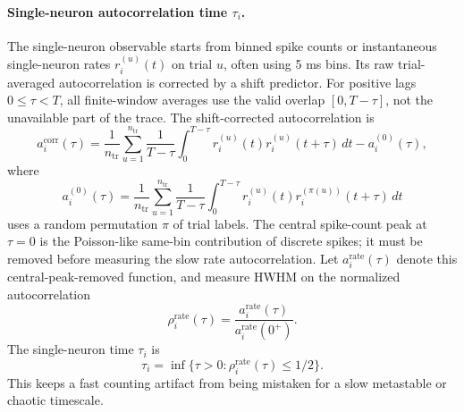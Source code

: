 \paragraph{Single-neuron autocorrelation time \(\tau_i\).}
The single-neuron observable starts from binned spike counts or instantaneous
single-neuron rates \(r_i^{(u)}(t)\) on trial \(u\), often using 5 ms bins. Its
raw trial-averaged autocorrelation is corrected by a shift predictor. For
positive lags \(0\le \tau<T\), all finite-window averages use the valid overlap
\([0,T-\tau]\), not the unavailable part of the trace. The shift-corrected
autocorrelation is
\begin{equation}
    a_i^{\mathrm{corr}}(\tau)
    =
    \frac{1}{n_{\mathrm{tr}}}
    \sum_{u=1}^{n_{\mathrm{tr}}}
    \frac{1}{T-\tau}
    \int_0^{T-\tau}
    r_i^{(u)}(t)r_i^{(u)}(t+\tau)\,dt
    -
    a_i^{(0)}(\tau),
    \label{eq:ch10-single-neuron-autocorrelation}
\end{equation}
where
\begin{equation}
    a_i^{(0)}(\tau)
    =
    \frac{1}{n_{\mathrm{tr}}}
    \sum_{u=1}^{n_{\mathrm{tr}}}
    \frac{1}{T-\tau}
    \int_0^{T-\tau}
    r_i^{(u)}(t)r_i^{(\pi(u))}(t+\tau)\,dt
    \label{eq:ch10-shift-predictor}
\end{equation}
uses a random permutation \(\pi\) of trial labels. The central spike-count peak
at \(\tau=0\) is the Poisson-like same-bin contribution of discrete spikes; it
must be removed before measuring the slow rate autocorrelation. Let
\(a_i^{\mathrm{rate}}(\tau)\) denote this central-peak-removed function, and
measure HWHM on the normalized autocorrelation
\[
    \rho_i^{\mathrm{rate}}(\tau)
    =
    \frac{a_i^{\mathrm{rate}}(\tau)}
    {a_i^{\mathrm{rate}}(0^+)}.
\]
The single-neuron time \(\tau_i\) is
\begin{equation}
    \tau_i
    =
    \inf\{\tau>0:\rho_i^{\mathrm{rate}}(\tau)\le 1/2\}.
    \label{eq:ch10-single-neuron-hwhm}
\end{equation}
This keeps a fast counting artifact from being mistaken for a slow metastable
or chaotic timescale.

